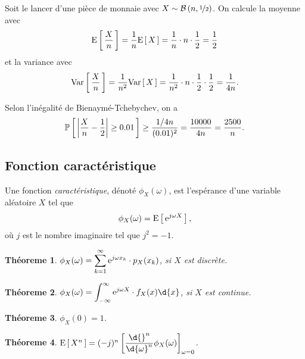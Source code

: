\documentclass[11pt]{article}
\renewcommand\P[1]{%
	\ensuremath{%
		\mathbb{P}\left[\,#1\,\right]%
	}%
}%
\newcommand\e{%
	\ensuremath{%
		\mathrm{e}%
	}%
}%
\newcommand\Bin[2]{%
	\ensuremath{%
		\mathcal{B}\left(#1,#2\right)%
	}%
}%
\newcommand\Esp[1]{%
	\ensuremath{%
		\mathrm{E}\left[\,#1\,\right]%
	}%
}%
\newcommand\Var[1]{%
	\ensuremath{%
		\mathrm{Var}\left[\,#1\,\right]%
	}%
}%
\newtheorem{theoreme}{Théoreme}[section]
\begin{document}
\begin{exemple}
	Soit le lancer d'une pièce de monnaie avec $X\sim\Bin{n}{\nicefrac{1}{2}}$.
	On calcule la moyenne avec
	\begin{equation*}
		\Esp{\frac{X}{n}}
		=\frac{1}{n}\Esp{X}
		=\frac{1}{n}\cdot n\cdot\frac{1}{2}
		=\frac{1}{2}
	\end{equation*}
	et la variance avec
	\begin{equation*}
		\Var{\frac{X}{n}}
		=\frac{1}{n^2}\Var{X}
		=\frac{1}{n^2}\cdot n\cdot\frac{1}{2}\cdot\frac{1}{2}
		=\frac{1}{4n}.
	\end{equation*}

	Selon l'inégalité de Bienaymé-Tchebychev, on a
	\begin{equation*}
		\P{\left|\frac{X}{n}-\frac{1}{2}\right|\geq 0.01}
		\geq\frac{1/4n}{(0.01)^2}
		=\frac{10000}{4n}
		=\frac{2500}{n}.
	\end{equation*}
\end{exemple}

\subsection{Fonction caractéristique}
\begin{definition}
	Une fonction \textit{caractéristique}, dénoté $\phi_X(\omega)$, est
	l'espérance d'une variable aléatoire $X$ tel que
	\begin{equation*}
		\phi_X(\omega)=\Esp{\e^{j\omega X}},
	\end{equation*}
	où $j$ est le nombre imaginaire tel que $j^2=-1$.
\end{definition}

\begin{theoreme}
	$\phi_X(\omega)=\displaystyle\sum_{k=1}^\infty\e^{j\omega x_k}\cdot
	p_X(x_k)$, si $X$ est discrète.
\end{theoreme}

\begin{theoreme}
	$\phi_X(\omega)=\displaystyle\int_{-\infty}^\infty\e^{j\omega X}\cdot
	f_X(x)\d{x}$, si $X$ est continue.
\end{theoreme}

\begin{theoreme}
	$\phi_X(0)=1$.
\end{theoreme}

\begin{theoreme}
	$\Esp{X^n}=(-j)^n\left[
	\dfrac{\d{}^n}{\d{\omega}^n}\phi_X(\omega)\right]_{\omega=0}$.
\end{theoreme}
\end{document}
